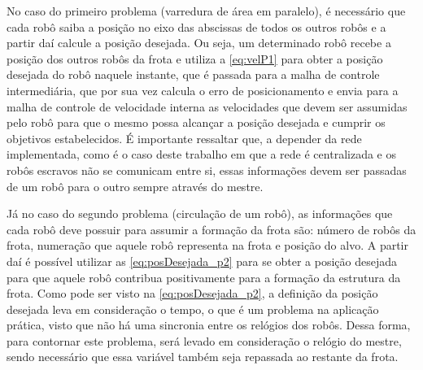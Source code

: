 No caso do primeiro problema (varredura de área em paralelo), é necessário que cada robô saiba a posição no eixo das abscissas de todos os outros robôs e a partir daí calcule a posição desejada. Ou seja, um determinado robô recebe a posição dos outros robôs da frota e utiliza a \autoref{eq:velP1} para obter a posição desejada do robô naquele instante, que é passada para a malha de controle intermediária, que por sua vez calcula o erro de posicionamento e envia para a malha de controle de velocidade interna as velocidades que devem ser assumidas pelo robô para que o mesmo possa alcançar a posição desejada e cumprir os objetivos estabelecidos. É importante ressaltar que, a depender da rede implementada, como é o caso deste trabalho em que a rede é centralizada e os robôs escravos não se comunicam entre si, essas informações devem ser passadas de um robô para o outro sempre através do mestre. %

Já no caso do segundo problema (circulação de um robô), as informações que cada robô deve possuir para assumir a formação da frota são: número de robôs da frota, numeração que aquele robô representa na frota e posição do alvo. A partir daí é possível utilizar as \autoref{eq:posDesejada_p2} para se obter a posição desejada para que aquele robô contribua positivamente para a formação da estrutura da frota. Como pode ser visto na \autoref{eq:posDesejada_p2}, a definição da posição desejada leva em consideração o tempo, o que é um problema na aplicação prática, visto que não há uma sincronia entre os relógios dos robôs. Dessa forma, para contornar este problema, será levado em consideração o relógio do mestre, sendo necessário que essa variável também seja repassada ao restante da frota. 











 


